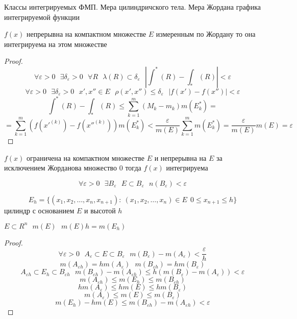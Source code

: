 \begin{title}[\Large]
  Классы интегрируемых ФМП. Мера цилиндричского тела. Мера Жордана графика
  интегрируемой функции
\end{title}

\begin{theorem}
  $f(x)$ непрерывна на компактном множестве $E$ измеренным по Жордану то она
  интегрируема на этом множестве
\end{theorem}

\begin{proof}
  $$
  \forall \varepsilon > 0 ~~~ \exists \delta_{\varepsilon} > 0 ~~~ \forall R
  ~~~  \lambda(R) \subset \delta_{\varepsilon} ~~~
  \left| \int^*(R) - \int_*(R) \right| < \varepsilon
  $$
  $$
  \forall \varepsilon > 0 ~~~ \exists \delta_{\varepsilon} > 0 ~~~
  x', x'' \in E ~~~ \rho (x', x'') \le \delta_{\varepsilon} ~~~
  |f(x') - f(x'')| < \varepsilon
  $$
  $$
  \int^*(R) - \int_*(R) \le \sum_{k=1}^m(M_k - m_k)m(E_k^*) =
  $$
  $$
  = \sum_{k=1}^m (f(x'^{(k)}) - f(x''^{(k)}))m(E_k^*) < \frac{\varepsilon}{m(E)}
  \sum_{k=1}^m m(E_k^*) = \frac{\varepsilon}{m(E)} m(E) = \varepsilon
  $$
\end{proof}

\begin{theorem}
  $f(x)$ ограничена на компактном множестве $E$ и непрерывна на $E$ за
  исключением Жорданова множество 0 тогда $f(x)$ интегрируема
\end{theorem}

\begin{define}
  $$
  \forall \varepsilon > 0 ~~~ \exists B_{\varepsilon} ~~~ E \subset
  B_{\varepsilon} ~~~ n(B_{\varepsilon}) < \varepsilon
  $$
\end{define}

\begin{define}
  $$
  E_h = \{ (x_1, x_2, \ldots, x_n, x_{n+1}): ~ (x_1, x_2, \ldots, x_n) \in E
  ~~ 0 \le x_{n+1} \le h\}
  $$
  цилиндр с основанием $E$ и высотой $h$
\end{define}

\begin{block}[Лемма]
  $E \subset R^n ~~~ m(E) ~~~ m(E)h = m(E_h)$
\end{block}

\begin{proof}
  $$
  \forall \varepsilon > 0 ~~~ A_{\varepsilon} \subset E \subset B_{\varepsilon}
  ~~~ m(B_{\varepsilon}) - m(A_{\varepsilon}) < \frac{\varepsilon}{h}
  $$
  $$
  m(A_{\varepsilon h}) = hm(A_{\varepsilon}) ~~~ m(B_{\varepsilon h}) =
  hm(B_{\varepsilon})
  $$
  $$
  A_{\varepsilon h} \subset E_h \subset B_{\varepsilon h} ~~~
  m(B_{\varepsilon h}) - m(A_{\varepsilon h}) \le h(m(B_{\varepsilon}) -
  m(A_{\varepsilon})) < \varepsilon
  $$
  $$
  m(A_{\varepsilon h}) \le m(E_h) \le m(B_{\varepsilon h})
  $$
  $$
  hm(A_{\varepsilon}) \le hm(E) \le hm(B_{\varepsilon})
  $$
  $$
  m(A_{\varepsilon}) \le m(E) \le m(B_{\varepsilon})
  $$
  $$
  m(E_h) - hm(E) \le m(B_{\varepsilon h}) - m(A_{\varepsilon h}) < \varepsilon
  $$
\end{proof}

